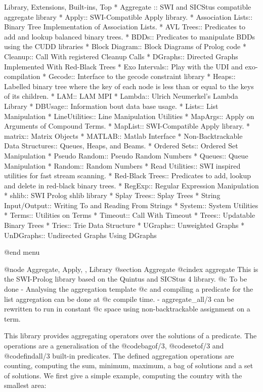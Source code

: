 Library, Extensions, Built-ins, Top
* Aggregate :: SWI and SICStus compatible aggregate library
* Apply:: SWI-Compatible Apply library.
* Association Lists:: Binary Tree Implementation of Association Lists.
* AVL Trees:: Predicates to add and lookup balanced binary  trees.
* BDDs:: Predicates to manipulate BDDs using the CUDD libraries
* Block Diagram:: Block Diagrams of Prolog code
* Cleanup:: Call With registered Cleanup Calls
* DGraphs:: Directed Graphs Implemented With Red-Black Trees
* Exo Intervals:: Play with the UDI and exo-compilation
* Gecode:: Interface to the gecode constraint library
* Heaps:: Labelled binary tree where the key of each node is less
    than or equal to the keys of its children.
* LAM:: LAM MPI
* Lambda:: Ulrich Neumerkel's Lambda Library
* DBUsage:: Information bout data base usage.
* Lists:: List Manipulation
* LineUtilities:: Line Manipulation Utilities
* MapArgs:: Apply on Arguments of Compound Terms.
* MapList:: SWI-Compatible Apply library.
* matrix:: Matrix Objects
* MATLAB:: Matlab Interface
* Non-Backtrackable Data Structures:: Queues, Heaps, and Beams.
* Ordered Sets:: Ordered Set Manipulation
* Pseudo Random:: Pseudo Random Numbers
* Queues:: Queue Manipulation
* Random:: Random Numbers
* Read Utilities:: SWI inspired utilities for fast stream scanning.
* Red-Black Trees:: Predicates to add, lookup and delete in red-black binary  trees.
* RegExp:: Regular Expression Manipulation
* shlib:: SWI Prolog shlib library
* Splay Trees:: Splay Trees
* String Input/Output:: Writing To and Reading From Strings
* System:: System Utilities
* Terms:: Utilities on Terms
* Timeout:: Call With Timeout
* Trees:: Updatable Binary Trees
* Tries:: Trie Data Structure
* UGraphs:: Unweighted Graphs
* UnDGraphs:: Undirected Graphs Using DGraphs


@end menu

 
@node Aggregate, Apply, , Library
@section Aggregate
@cindex aggregate
This is the SWI-Prolog library based on  the Quintus and SICStus 4
library.   @c To be done - Analysing the aggregation template
@c and compiling a predicate for the list aggregation can be done at
@c compile time.  - aggregate_all/3 can be rewritten to run in constant
@c space using non-backtrackable assignment on a term.

This library provides aggregating operators over the solutions of a
predicate. The operations are a generalisation of the @code{bagof/3},
@code{setof/3} and @code{findall/3} built-in predicates. The defined
aggregation operations are counting, computing the sum, minimum,
maximum, a bag of solutions and a set of solutions. We first give a
simple example, computing the country with the smallest area:

